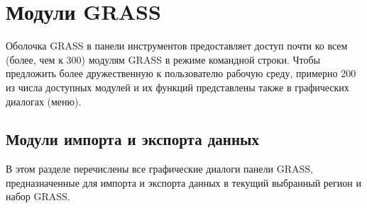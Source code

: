 \chapter{Модули GRASS}\label{appdx_grass_toolbox_modules}


Оболочка GRASS в панели инструментов предоставляет доступ почти ко всем
(более, чем к 300) модулям GRASS в режиме командной строки. Чтобы предложить
более дружественную к пользователю рабочую среду, примерно 200 из числа
доступных модулей и их функций представлены также в графических диалогах
(меню).

\section{Модули импорта и экспорта данных}

В этом разделе перечислены все графические диалоги панели GRASS,
предназначенные для импорта и экспорта данных в текущий выбранный регион
и набор GRASS.

